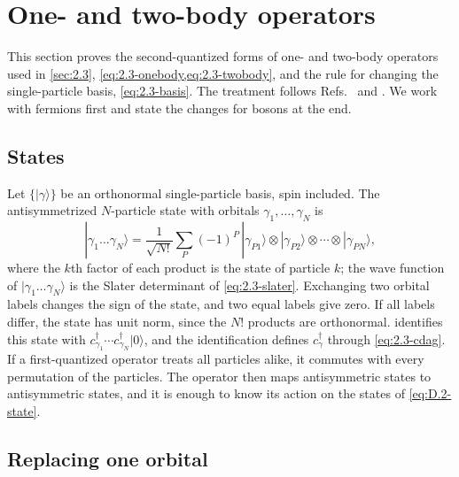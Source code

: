 \section{One- and two-body operators}\label{app:D.2}

This section proves the second-quantized forms of one- and two-body operators used in \cref{sec:2.3}, \cref{eq:2.3-onebody,eq:2.3-twobody}, and the rule for changing the single-particle basis, \cref{eq:2.3-basis}. The treatment follows Refs.~\cite[Chap.~1]{bruus2004many} and \cite[Chap.~1]{fetter1971quantum}. We work with fermions first and state the changes for bosons at the end.

\subsection*{States}

Let $\{|\gamma\rangle\}$ be an orthonormal single-particle basis, spin included. The antisymmetrized $N$-particle state with orbitals $\gamma_1,\dots,\gamma_N$ is
\begin{equation}
  |\gamma_1\dots\gamma_N\rangle = \frac{1}{\sqrt{N!}}\sum_P(-1)^P\,|\gamma_{P1}\rangle\otimes|\gamma_{P2}\rangle\otimes\cdots\otimes|\gamma_{PN}\rangle ,
  \label{eq:D.2-state}
\end{equation}
where the $k$th factor of each product is the state of particle $k$; the wave function of $|\gamma_1\dots\gamma_N\rangle$ is the Slater determinant of \cref{eq:2.3-slater}. Exchanging two orbital labels changes the sign of the state, and two equal labels give zero. If all labels differ, the state has unit norm, since the $N!$ products are orthonormal.  identifies this state with $c^\dagger_{\gamma_1}\cdots c^\dagger_{\gamma_N}|0\rangle$, and the identification defines $c^\dagger_\gamma$ through \cref{eq:2.3-cdag}. If a first-quantized operator treats all particles alike, it commutes with every permutation of the particles. The operator then maps antisymmetric states to antisymmetric states, and it is enough to know its action on the states of \cref{eq:D.2-state}.

\subsection*{Replacing one orbital}

